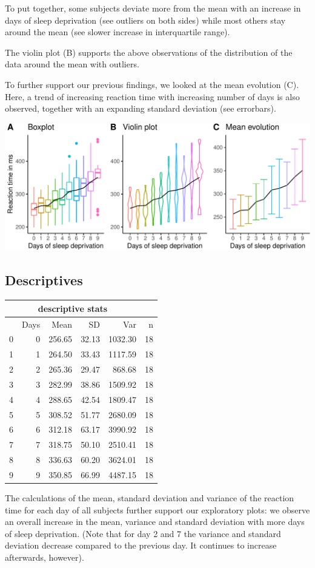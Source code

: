\documentclass[
]{article}
\begin{document}
To put together, some subjects deviate more from the mean with an
increase in days of sleep deprivation (see outliers on both sides) while
most others stay around the mean (see slower increase in interquartile
range).

The violin plot (B) supports the above observations of the distribution
of the data around the mean with outliers.

To further support our previous findings, we looked at the mean
evolution (C). Here, a trend of increasing reaction time with increasing
number of days is also observed, together with an expanding standard
deviation (see errorbars).

\begin{center}\includegraphics{common_sleep_files/figure-latex/boxplot-1} \end{center}

\pagebreak

\hypertarget{descriptives}{%
\subsection{Descriptives}\label{descriptives}}
\begin{longtable}[]{@{}lrrrrr@{}}
\toprule
\multicolumn{5}{c}{descriptive stats}\tabularnewline
\midrule
& Days & Mean & SD & Var & n\tabularnewline
\midrule
\endhead
0 & 0 & 256.65 & 32.13 & 1032.30 & 18\tabularnewline
1 & 1 & 264.50 & 33.43 & 1117.59 & 18\tabularnewline
2 & 2 & 265.36 & 29.47 & 868.68 & 18\tabularnewline
3 & 3 & 282.99 & 38.86 & 1509.92 & 18\tabularnewline
4 & 4 & 288.65 & 42.54 & 1809.47 & 18\tabularnewline
5 & 5 & 308.52 & 51.77 & 2680.09 & 18\tabularnewline
6 & 6 & 312.18 & 63.17 & 3990.92 & 18\tabularnewline
7 & 7 & 318.75 & 50.10 & 2510.41 & 18\tabularnewline
8 & 8 & 336.63 & 60.20 & 3624.01 & 18\tabularnewline
9 & 9 & 350.85 & 66.99 & 4487.15 & 18\tabularnewline
\bottomrule
\end{longtable}

The calculations of the mean, standard deviation and variance of the
reaction time for each day of all subjects further support our
exploratory plots: we observe an overall increase in the mean, variance
and standard deviation with more days of sleep deprivation. (Note that
for day 2 and 7 the variance and standard deviation decrease compared to
the previous day. It continues to increase afterwards, however).
\end{document}
